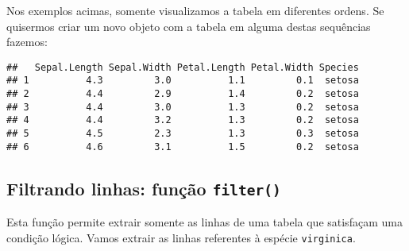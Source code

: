 \documentclass[
]{book}
\newenvironment{Shaded}{\begin{snugshade}}{\end{snugshade}}
\newcommand{\KeywordTok}[1]{\textcolor[rgb]{0.13,0.29,0.53}{\textbf{#1}}}
\newcommand{\NormalTok}[1]{#1}
\newcommand{\OperatorTok}[1]{\textcolor[rgb]{0.81,0.36,0.00}{\textbf{#1}}}
\newcommand{\StringTok}[1]{\textcolor[rgb]{0.31,0.60,0.02}{#1}}
\begin{document}
\begin{Shaded}
\end{Shaded}

Nos exemplos acimas, somente visualizamos a tabela em diferentes ordens. Se quisermos criar um novo objeto com a tabela em alguma destas sequências fazemos:

\begin{Shaded}
\end{Shaded}

\begin{verbatim}
##   Sepal.Length Sepal.Width Petal.Length Petal.Width Species
## 1          4.3         3.0          1.1         0.1  setosa
## 2          4.4         2.9          1.4         0.2  setosa
## 3          4.4         3.0          1.3         0.2  setosa
## 4          4.4         3.2          1.3         0.2  setosa
## 5          4.5         2.3          1.3         0.3  setosa
## 6          4.6         3.1          1.5         0.2  setosa
\end{verbatim}

\hypertarget{filtrando-linhas-funuxe7uxe3o-filter}{%
\subsection{\texorpdfstring{Filtrando linhas: função \texttt{filter()}}{Filtrando linhas: função filter()}}\label{filtrando-linhas-funuxe7uxe3o-filter}}

Esta função permite extrair somente as linhas de uma tabela que satisfaçam uma condição lógica. Vamos extrair as linhas referentes à espécie \texttt{virginica}.

\begin{Shaded}
\end{Shaded}
\end{document}
